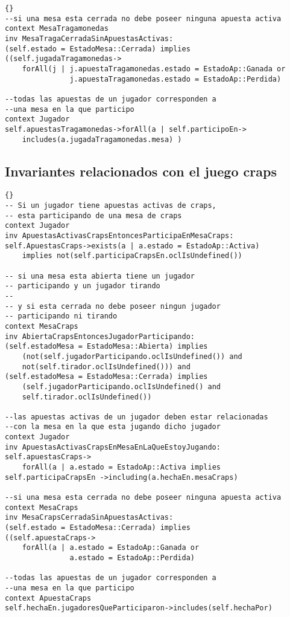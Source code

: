 \begin{framed}
\begin{lstlisting}[frame=trbl]{}
--si una mesa esta cerrada no debe poseer ninguna apuesta activa
context MesaTragamonedas
inv MesaTragaCerradaSinApuestasActivas:
(self.estado = EstadoMesa::Cerrada) implies 
((self.jugadaTragamonedas->
    forAll(j | j.apuestaTragamonedas.estado = EstadoAp::Ganada or 
               j.apuestaTragamonedas.estado = EstadoAp::Perdida)

--todas las apuestas de un jugador corresponden a 
--una mesa en la que participo
context Jugador
self.apuestasTragamonedas->forAll(a | self.participoEn->
    includes(a.jugadaTragamonedas.mesa) )
\end{lstlisting}

\subsection{Invariantes relacionados con el juego craps}

\lstset{language=ocl}
\lstset{commentstyle=\textit}
\begin{lstlisting}[frame=trbl]{}
-- Si un jugador tiene apuestas activas de craps,
-- esta participando de una mesa de craps
context Jugador
inv ApuestasActivasCrapsEntoncesParticipaEnMesaCraps:
self.ApuestasCraps->exists(a | a.estado = EstadoAp::Activa)
    implies not(self.participaCrapsEn.oclIsUndefined())
    
-- si una mesa esta abierta tiene un jugador 
-- participando y un jugador tirando
--
-- y si esta cerrada no debe poseer ningun jugador 
-- participando ni tirando
context MesaCraps
inv AbiertaCrapsEntoncesJugadorParticipando:
(self.estadoMesa = EstadoMesa::Abierta) implies 
    (not(self.jugadorParticipando.oclIsUndefined()) and
    not(self.tirador.oclIsUndefined())) and
(self.estadoMesa = EstadoMesa::Cerrada) implies 
    (self.jugadorParticipando.oclIsUndefined() and
    self.tirador.oclIsUndefined())
    
--las apuestas activas de un jugador deben estar relacionadas 
--con la mesa en la que esta jugando dicho jugador
context Jugador
inv ApuestasActivasCrapsEnMesaEnLaQueEstoyJugando:
self.apuestasCraps->
    forAll(a | a.estado = EstadoAp::Activa implies 
self.participaCrapsEn ->including(a.hechaEn.mesaCraps)

--si una mesa esta cerrada no debe poseer ninguna apuesta activa
context MesaCraps
inv MesaCrapsCerradaSinApuestasActivas:
(self.estado = EstadoMesa::Cerrada) implies 
((self.apuestaCraps->
    forAll(a | a.estado = EstadoAp::Ganada or 
               a.estado = EstadoAp::Perdida)

--todas las apuestas de un jugador corresponden a 
--una mesa en la que participo
context ApuestaCraps
self.hechaEn.jugadoresQueParticiparon->includes(self.hechaPor)

\end{lstlisting}
\end{framed}

